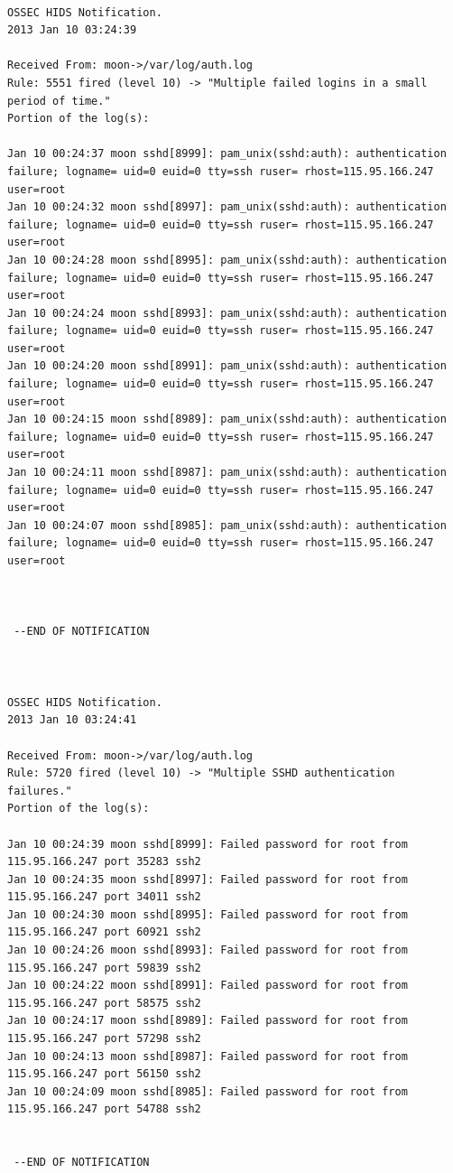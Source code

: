 \documentclass[12pt]{article}
\begin{document}
\begin{verbatim}

OSSEC HIDS Notification.
2013 Jan 10 03:24:39

Received From: moon->/var/log/auth.log
Rule: 5551 fired (level 10) -> "Multiple failed logins in a small period of time."
Portion of the log(s):

Jan 10 00:24:37 moon sshd[8999]: pam_unix(sshd:auth): authentication failure; logname= uid=0 euid=0 tty=ssh ruser= rhost=115.95.166.247  user=root
Jan 10 00:24:32 moon sshd[8997]: pam_unix(sshd:auth): authentication failure; logname= uid=0 euid=0 tty=ssh ruser= rhost=115.95.166.247  user=root
Jan 10 00:24:28 moon sshd[8995]: pam_unix(sshd:auth): authentication failure; logname= uid=0 euid=0 tty=ssh ruser= rhost=115.95.166.247  user=root
Jan 10 00:24:24 moon sshd[8993]: pam_unix(sshd:auth): authentication failure; logname= uid=0 euid=0 tty=ssh ruser= rhost=115.95.166.247  user=root
Jan 10 00:24:20 moon sshd[8991]: pam_unix(sshd:auth): authentication failure; logname= uid=0 euid=0 tty=ssh ruser= rhost=115.95.166.247  user=root
Jan 10 00:24:15 moon sshd[8989]: pam_unix(sshd:auth): authentication failure; logname= uid=0 euid=0 tty=ssh ruser= rhost=115.95.166.247  user=root
Jan 10 00:24:11 moon sshd[8987]: pam_unix(sshd:auth): authentication failure; logname= uid=0 euid=0 tty=ssh ruser= rhost=115.95.166.247  user=root
Jan 10 00:24:07 moon sshd[8985]: pam_unix(sshd:auth): authentication failure; logname= uid=0 euid=0 tty=ssh ruser= rhost=115.95.166.247  user=root



 --END OF NOTIFICATION



OSSEC HIDS Notification.
2013 Jan 10 03:24:41

Received From: moon->/var/log/auth.log
Rule: 5720 fired (level 10) -> "Multiple SSHD authentication failures."
Portion of the log(s):

Jan 10 00:24:39 moon sshd[8999]: Failed password for root from 115.95.166.247 port 35283 ssh2
Jan 10 00:24:35 moon sshd[8997]: Failed password for root from 115.95.166.247 port 34011 ssh2
Jan 10 00:24:30 moon sshd[8995]: Failed password for root from 115.95.166.247 port 60921 ssh2
Jan 10 00:24:26 moon sshd[8993]: Failed password for root from 115.95.166.247 port 59839 ssh2
Jan 10 00:24:22 moon sshd[8991]: Failed password for root from 115.95.166.247 port 58575 ssh2
Jan 10 00:24:17 moon sshd[8989]: Failed password for root from 115.95.166.247 port 57298 ssh2
Jan 10 00:24:13 moon sshd[8987]: Failed password for root from 115.95.166.247 port 56150 ssh2
Jan 10 00:24:09 moon sshd[8985]: Failed password for root from 115.95.166.247 port 54788 ssh2


 --END OF NOTIFICATION

\end{verbatim}
\end{document}
